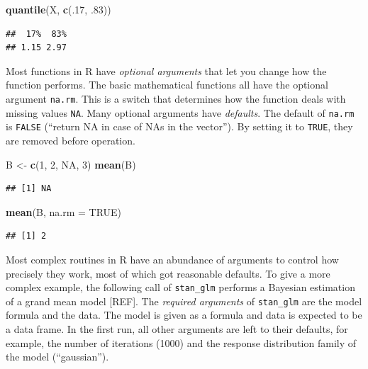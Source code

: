 \documentclass[]{svmono}
\newenvironment{Shaded}{\begin{snugshade}}{\end{snugshade}}
\newcommand{\KeywordTok}[1]{\textcolor[rgb]{0.13,0.29,0.53}{\textbf{#1}}}
\newcommand{\DataTypeTok}[1]{\textcolor[rgb]{0.13,0.29,0.53}{#1}}
\newcommand{\DecValTok}[1]{\textcolor[rgb]{0.00,0.00,0.81}{#1}}
\newcommand{\StringTok}[1]{\textcolor[rgb]{0.31,0.60,0.02}{#1}}
\newcommand{\OtherTok}[1]{\textcolor[rgb]{0.56,0.35,0.01}{#1}}
\newcommand{\NormalTok}[1]{#1}
\begin{document}
\begin{Shaded}
\begin{Highlighting}[]
\KeywordTok{quantile}\NormalTok{(X, }\KeywordTok{c}\NormalTok{(.}\DecValTok{17}\NormalTok{, .}\DecValTok{83}\NormalTok{))}
\end{Highlighting}
\end{Shaded}

\begin{verbatim}
##  17%  83% 
## 1.15 2.97
\end{verbatim}

Most functions in R have \emph{optional arguments} that let you change
how the function performs. The basic mathematical functions all have the
optional argument \texttt{na.rm}. This is a switch that determines how
the function deals with missing values \texttt{NA}. Many optional
arguments have \emph{defaults}. The default of \texttt{na.rm} is
\texttt{FALSE} (``return NA in case of NAs in the vector''). By setting
it to \texttt{TRUE}, they are removed before operation.

\begin{Shaded}
\begin{Highlighting}[]
\NormalTok{B <-}\StringTok{ }\KeywordTok{c}\NormalTok{(}\DecValTok{1}\NormalTok{, }\DecValTok{2}\NormalTok{, }\OtherTok{NA}\NormalTok{, }\DecValTok{3}\NormalTok{)}
\KeywordTok{mean}\NormalTok{(B)}
\end{Highlighting}
\end{Shaded}

\begin{verbatim}
## [1] NA
\end{verbatim}

\begin{Shaded}
\begin{Highlighting}[]
\KeywordTok{mean}\NormalTok{(B, }\DataTypeTok{na.rm =} \OtherTok{TRUE}\NormalTok{)}
\end{Highlighting}
\end{Shaded}

\begin{verbatim}
## [1] 2
\end{verbatim}

Most complex routines in R have an abundance of arguments to control how
precisely they work, most of which got reasonable defaults. To give a
more complex example, the following call of \texttt{stan\_glm} performs
a Bayesian estimation of a grand mean model {[}REF{]}. The
\emph{required arguments} of \texttt{stan\_glm} are the model formula
and the data. The model is given as a formula and data is expected to be
a data frame. In the first run, all other arguments are left to their
defaults, for example, the number of iterations (1000) and the response
distribution family of the model (``gaussian'').
\end{document}
